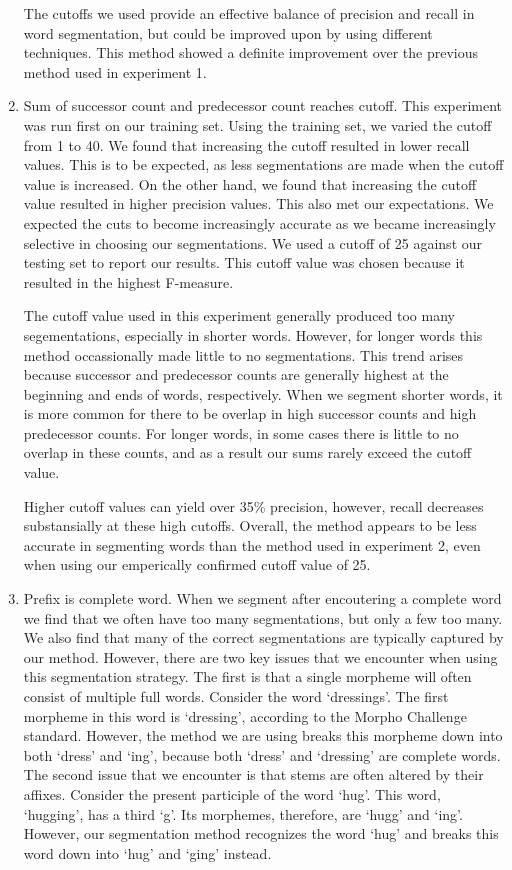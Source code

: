 \documentclass[11pt,letterpaper]{article}
\begin{document}
\begin{enumerate}
The cutoffs we used provide an effective balance of precision and recall in word segmentation, but could be improved upon by using different techniques. This method showed a definite improvement over the previous method used in experiment 1.

\item Sum of successor count and predecessor count reaches cutoff. This experiment was run first on our training set. Using the training set, we varied the cutoff from 1 to 40. We found that increasing the cutoff resulted in lower recall values. This is to be expected, as less segmentations are made when the cutoff value is increased. On the other hand, we found that increasing the cutoff value resulted in higher precision values. This also met our expectations. We expected the cuts to become increasingly accurate as we became increasingly selective in choosing our segmentations. We used a cutoff of 25 against our testing set to report our results. This cutoff value was chosen because it resulted in the highest F-measure.

The cutoff value used in this experiment generally produced too many segementations, especially in shorter words. However, for longer words this method occassionally made little to no segmentations. This trend arises because successor and predecessor counts are generally highest at the beginning and ends of words, respectively. When we segment shorter words, it is more common for there to be overlap in high successor counts and high predecessor counts. For longer words, in some cases there is little to no overlap in these counts, and as a result our sums rarely exceed the cutoff value.

Higher cutoff values can yield over 35\% precision, however, recall decreases substansially at these high cutoffs. Overall, the method appears to be less accurate in segmenting words than the method used in experiment 2, even when using our emperically confirmed cutoff value of 25.

\item Prefix is complete word. When we segment after encoutering a complete word we find that we often have too many segmentations, but only a few too many. We also find that many of the correct segmentations are typically captured by our method. However, there are two key issues that we encounter when using this segmentation strategy. The first is that a single morpheme will often consist of multiple full words. Consider the word `dressings'. The first morpheme in this word is `dressing', according to the Morpho Challenge standard. However, the method we are using breaks this morpheme down into both `dress' and `ing', because both `dress' and `dressing' are complete words. The second issue that we encounter is that stems are often altered by their affixes. Consider the present participle of the word `hug'. This word, `hugging', has a third `g'. Its morphemes, therefore, are `hugg' and `ing'. However,  our segmentation method recognizes the word `hug' and breaks this word down into `hug' and `ging' instead.


\end{enumerate}
\end{document}
